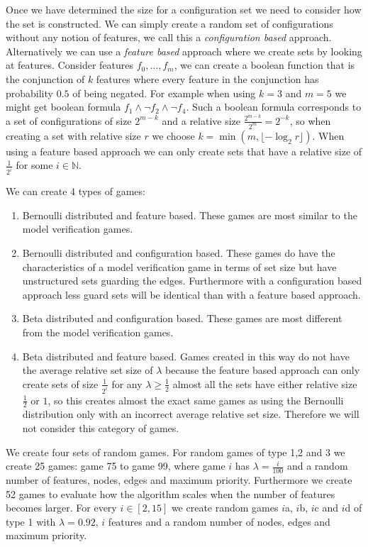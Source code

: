 Once we have determined the size for a configuration set we need to consider how the set is constructed. We can simply create a random set of configurations without any notion of features, we call this a \textit{configuration based} approach. Alternatively we can use a \textit{feature based} approach where we create sets by looking at features. Consider features $f_0, \dots, f_m$, we can create a boolean function that is the conjunction of $k$ features where every feature in the conjunction has probability $0.5$ of being negated.  For example when using $k=3$ and $m=5$ we might get boolean formula $f_1 \wedge \neg f_2 \wedge \neg f_4$. Such a boolean formula corresponds to a set of configurations of size $2^{m-k}$ and a relative size $\frac{2^{m-k}}{2^m} = 2^{-k}$, so when creating a set with relative size $r$ we choose $k = \min(m, \lfloor -\log_2{r} \rfloor)$. When using a feature based approach we can only create sets that have a relative size of $\frac{1}{2^i}$ for some $i \in \mathbb{N}$.

We can create 4 types of games:
\begin{enumerate}
	\item Bernoulli distributed and feature based. These games are most similar to the model verification games.
	\item Bernoulli distributed and configuration based. These games do have the characteristics of a model verification game in terms of set size but have unstructured sets guarding the edges. Furthermore with a configuration based approach less guard sets will be identical than with a feature based approach.
	\item Beta distributed and configuration based. These games are most different from the model verification games.
	\item Beta distributed and feature based. Games created in this way do not have the average relative set size of $\lambda$ because the feature based approach can only create sets of size $\frac{1}{2^i}$ for any $\lambda \geq \frac{1}{2}$ almost all the sets have either relative size $\frac{1}{2}$ or $1$, so  this creates almost the exact same games as using the Bernoulli distribution only with an incorrect average relative set size. Therefore we will not consider this category of games.
\end{enumerate}

We create four sets of random games. For random games of type 1,2 and 3 we create 25 games: game 75 to game 99, where game $i$ has $\lambda=\frac{i}{100}$ and a random number of features, nodes, edges and maximum priority. Furthermore we create 52 games to evaluate how the algorithm scales when the number of features becomes larger. For every $i \in [2,15]$ we create random games $i$a, $i$b, $i$c and $i$d of type 1 with $\lambda=0.92$, $i$ features and a random number of nodes, edges and maximum priority. 

